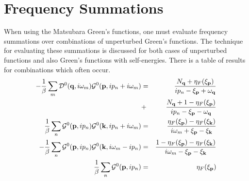 \section{Frequency Summations}
When using the Matsubara Green's functions, one must evaluate frequency summations over combinations of unperturbed Green's functions.
The technique for evaluating these summations is discussed for both cases of unperturbed functions and also Green's functions with self-energies.
There is a table of results for combinations which often occur.
\begin{eqnarray}
  -\frac{1}{\beta} \sum_m \mathcal{D}^0(\mathbf{q},i\omega_m)\mathcal{G}^0(\mathbf{p},ip_n+i\omega_m) &=& \frac{N_{\mathbf{q}} + \eta_F(\xi_{\mathbf{p}})}{ip_n-\xi_{\mathbf{p}}+\omega_{\mathbf{q}}} \nonumber \\
  &+& \frac{N_{\mathbf{q}} + 1 - \eta_F(\xi_{\mathbf{p}})}{ip_n -\xi_{\mathbf{p}}-\omega_{\mathbf{q}}} \label{3.216} \\
  \frac{1}{\beta} \sum_n \mathcal{G}^0(\mathbf{p},ip_n) \mathcal{G}^0(\mathbf{k},ip_n+i\omega_m) &=& \frac{\eta_F(\xi_{\mathbf{p}})-\eta_F(\xi_{\mathbf{k}})}{i\omega_m + \xi_{\mathbf{p}} -\xi_{\mathbf{k}}} \label{3.217} \\
  -\frac{1}{\beta} \sum_n \mathcal{G}^0(\mathbf{p},ip_n) \mathcal{G}^0(\mathbf{k},i\omega_m-ip_n) &=& \frac{1-\eta_F(\xi_{\mathbf{p}}) - \eta_F(\xi_{\mathbf{k}})}{i\omega_m -\xi_{\mathbf{p}} -\xi_{\mathbf{k}}} \label{3.218}\\
  \frac{1}{\beta} \sum_n \mathcal{G}^0(\mathbf{p},ip_n) &=& \eta_F(\xi_{\mathbf{p}})\label{3.219}
\end{eqnarray}

